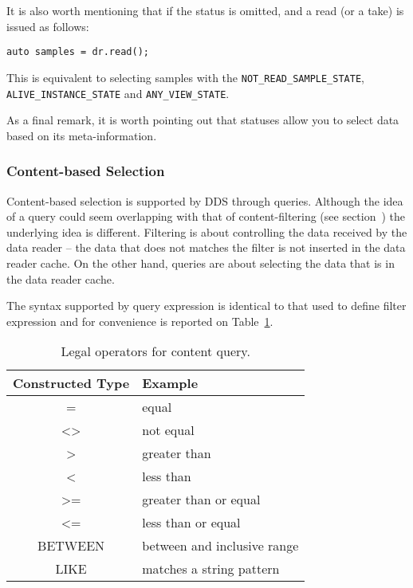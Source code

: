 It is also worth mentioning that if the status is omitted, and a read (or a take) is issued as follows:

\begin{lstlisting}[frame=tb]
  auto samples = dr.read();
\end{lstlisting}



This is equivalent to selecting samples with the 
\texttt{NOT\_READ\_SAMPLE\_STATE}, \texttt{ALIVE\_INSTANCE\_STATE} and \texttt{ANY\_VIEW\_STATE}.

As a final remark, it is worth pointing out that statuses allow you to select
data based on its meta-information.  

\subsubsection{Content-based Selection} 
Content-based selection is supported by \ac{DDS} through queries. 
Although the idea of a query could seem overlapping with that of content-filtering
(see section~\label{Section:Content:Filtering}) the underlying idea is different.
Filtering is about controlling the data received by the data reader -- the data that does
not matches the filter is not inserted in the data reader cache. On the other hand,
queries are about selecting the data that is in the data reader cache.

The syntax supported by query expression is identical to that used to define 
filter expression and for convenience is reported on Table~\ref{Table:DDS:Query:Expression}. 
\begin{table}
\begin{center}
{\footnotesize\ttfamily
\begin{tabular}{|c|l|} \hline
\textbf{Constructed Type} 	&  	\textbf{Example}  			\\ \hline
              =           	&  	equal  						\\ \hline
              <>          	&  	not equal					\\ \hline
              >           	&  	greater than  				\\ \hline
              <				& 	less than					\\ \hline
              >=				& 	greater than or equal 		\\ \hline
              <=				&	less than or equal			\\ \hline
              BETWEEN		&   between and inclusive range	\\ \hline
              LIKE			&	matches a string pattern		\\ \hline               
\end{tabular}}
\end{center}
\label{Table:DDS:Query:Expression}
\caption{Legal operators for content query.}
\end{table}

